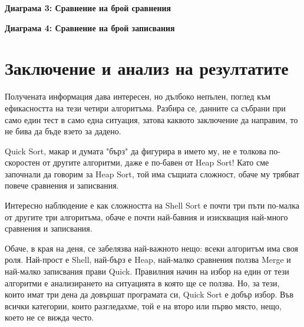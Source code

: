 \documentclass[12pt,a4paper]{article}
\begin{document}
\begin{center}
\textbf{Диаграма 3: Сравнение на брой сравнения}


\textbf{Диаграма 4: Сравнение на брой записвания}
  
\end{center}

\section{Заключение и анализ на резултатите}

Получената информация дава интересен, но дълбоко непълен, поглед към ефикасността на тези четири алгоритъма. 
Разбира се, данните са събрани при само един тест в само една ситуация, затова каквото заключение да направим, то не бива да бъде взето за дадено.

Quick Sort, макар и думата "бърз" да фигурира в името му, не е толкова по-скоростен от другите алгоритми, даже е по-бавен от Heap Sort!
Като сме започнали да говорим за Heap Sort, той има същиата сложност, обаче му трябват повече сравнения и записвания.

Интересно наблюдение е как сложността на Shell Sort е почти три пъти по-малка от другите три алгоритъма, обаче е почти най-бавния и изискващия най-много сравнения и записвания.

Обаче, в края на деня, се забелязва най-важното нещо: всеки алгоритъм има своя роля. Най-прост е Shell, най-бърз е Heap, най-малко сравнения ползва Merge и най-малко записвания прави Quick. 
Правилния начин на избор на един от тези алгоритми е анализирането на ситуацията в която ще се ползва. 
Но, за тези, които имат три дена да довършат програмата си, Quick Sort е добър избор. 
Във всички категории, които разгледахме, той е на второ или първо място, нещо, което не се вижда често.

\newpage

\nocite{*}

\end{document}
